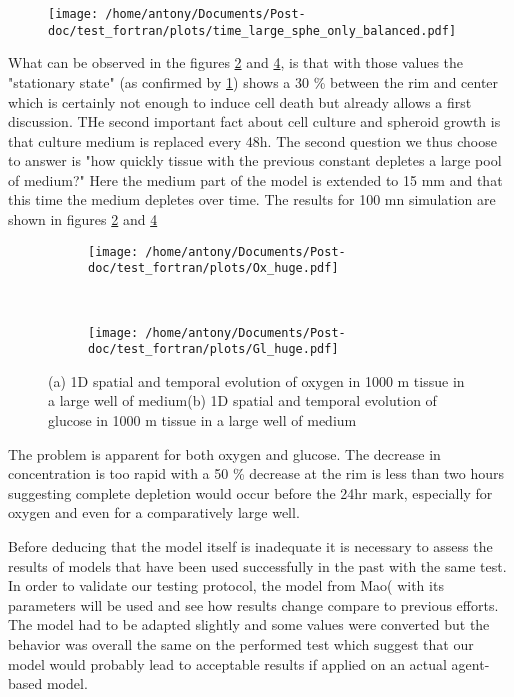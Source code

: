 \documentclass[11pt,a4paper]{article}
\begin{document}
\begin{figure}[ht!]
	\centering
	\texttt{[image: /home/antony/Documents/Post-doc/test\_fortran/plots/time\_large\_sphe\_only\_balanced.pdf]}
	\caption{\label{t_bal}}
\end{figure}

What can be observed in the figures \ref{Ox_bal} and \ref{Gl_bal}, is that with those values the "stationary state" (as confirmed by \ref{t_bal}) shows a 30 \% between the rim and center which is certainly not enough to induce cell death but already allows a first discussion. THe second important fact about cell culture and spheroid growth is that culture medium is replaced every 48h. The second question we thus choose to answer is "how quickly tissue with  the previous constant depletes a large pool of medium?" Here the medium part of the model is extended to 15 mm and that this time the medium depletes over time. The results for 100 mn simulation are shown in  figures \ref{Ox_bal} and \ref{Gl_bal}

\begin{figure}[ht!]
	\begin{subfigure}{0.5\textwidth}
	\centering
	\texttt{[image: /home/antony/Documents/Post-doc/test\_fortran/plots/Ox\_huge.pdf]}
	\caption{ \label{Ox_bal}}
	\end{subfigure}
	~~
	\begin{subfigure}{0.5\textwidth}
	\texttt{[image: /home/antony/Documents/Post-doc/test\_fortran/plots/Gl\_huge.pdf]}
		\caption{ \label{Gl_bal}}
	\end{subfigure}
	\caption{(a) 1D spatial and temporal evolution of oxygen in 1000 \textmu m tissue in a large well of medium(b) 1D spatial and temporal evolution of glucose in 1000 \textmu m tissue in a large well of medium}
\end{figure}

The problem is apparent for both oxygen and glucose. The decrease in concentration is too rapid with a 50 \% decrease at the rim is less than two hours suggesting complete depletion would occur before the 24hr mark, especially for oxygen and even for a comparatively large well.

Before deducing that the model itself is inadequate it is necessary to assess the results of models that have been used successfully in the past with the same test. In order to validate our testing protocol, the model from Mao(\cite{Mao2018} with its parameters will be used and see how results change compare to previous efforts. The model had to be adapted slightly and some values were converted but the behavior was overall the same on the performed test which suggest that our model would probably lead to acceptable results if applied on an actual agent-based model.
\end{document}
